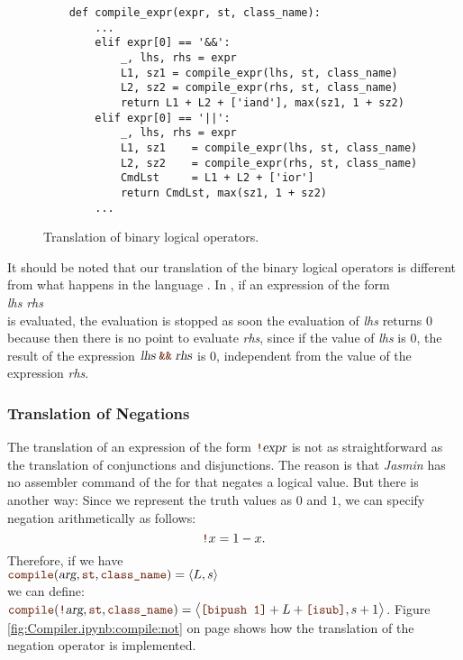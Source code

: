 \begin{figure}[!ht]
\centering
\begin{verbatim}
    def compile_expr(expr, st, class_name):
        ...
        elif expr[0] == '&&':
            _, lhs, rhs = expr
            L1, sz1 = compile_expr(lhs, st, class_name)
            L2, sz2 = compile_expr(rhs, st, class_name)
            return L1 + L2 + ['iand'], max(sz1, 1 + sz2)
        elif expr[0] == '||':
            _, lhs, rhs = expr
            L1, sz1    = compile_expr(lhs, st, class_name)
            L2, sz2    = compile_expr(rhs, st, class_name)
            CmdLst     = L1 + L2 + ['ior']
            return CmdLst, max(sz1, 1 + sz2)
        ...
\end{verbatim}
\vspace*{-0.3cm}
\caption{Translation of binary logical operators.}
\label{fig:Compiler.ipynb:compile:iand}
\end{figure}

It should be noted that our translation of the binary logical operators is different from
what happens in the language .  In , if an expression of the form
\\[0.2cm]
\hspace*{1.3cm}
\textsl{lhs} \mytt{\&\&} \textsl{rhs}
\\[0.2cm]
is evaluated, the evaluation is stopped as soon the evaluation of \textsl{lhs}
returns $0$ because then there is no point to evaluate \textsl{rhs}, since if the value of \textsl{lhs} is $0$,
the result of the expression $\textsl{lhs} \;\mytt{\&\&}\; \textsl{rhs}$ is $0$, independent from the value of
the expression \textsl{rhs}. 

\subsubsection{Translation of Negations}
The translation of an expression of the form $\mytt{!}\textsl{expr}$ is not as straightforward as the
translation of conjunctions and disjunctions.  The reason is that \textsl{Jasmin} has no assembler command of
the for  that negates a logical value.  But there is another way: Since we represent the truth
values as $0$ and $1$, we can specify negation arithmetically as follows:
\[ \mytt{!}x = 1 - x. \]
Therefore, if we have
\\[0.2cm]
\hspace*{1.3cm}
$\mytt{compile}(\textsl{arg}, \mytt{st}, \mytt{class\_name}) = \pair(L, s)$
\\[0.2cm]
we can define:
\\[0.2cm]
\hspace*{1.3cm}
$\mytt{compile}(\mytt{!}\textsl{arg}, \mytt{st}, \mytt{class\_name})
  = \bigl\langle \mytt{[bipush 1]} + L + \mytt{[isub]}, s + 1 \bigr\rangle$.
Figure \ref{fig:Compiler.ipynb:compile:not} on page \pageref{fig:Compiler.ipynb:compile:not} shows how the
translation of the negation operator is implemented.

